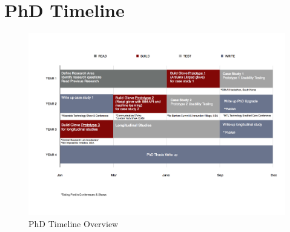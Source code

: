 \chapter{PhD Timeline}

\begin{figure}
    \centering
    \includegraphics{./assets/img/Timeline}
    \caption{PhD Timeline Overview}
    \label{fig:timeline}
\end{figure}